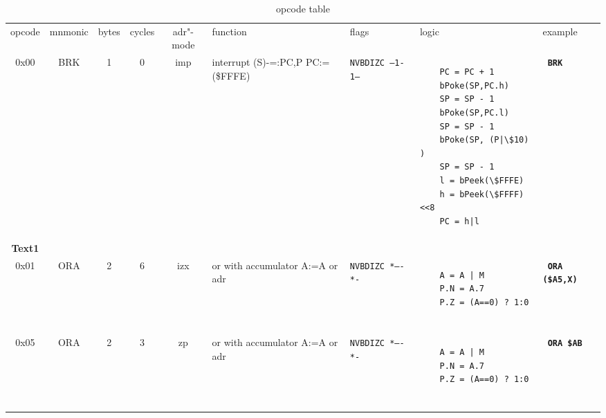 \documentclass[a4paper]{article}
\begin{document}
 
\setlength\parskip{0.5cm}


\newcommand{\flags}[2]{ 
\texttt{#1}\newline \texttt{#2}
}
\newcommand{\flagss}[2]{ 
\texttt{#1}\\ \texttt{#2}
}

\begin{sidewaystable}
  \centering
  \begin{tabular}{cccccp{2cm}p{1cm}p{6cm}p{3cm}}
opcode  &  mnmonic  &  bytes  &  cycles  &  adr"-mode  &  function  & flags & logic & example \\ 
0x00  &  BRK  & 1  & 0  &  imp  &  interrupt  \newline  (S)-=:PC,P PC:=(\$FFFE)  & \flags{NVBDIZC}{ --1-1-- } & \begin{lstlisting}
    PC = PC + 1 
    bPoke(SP,PC.h) 
    SP = SP - 1 
    bPoke(SP,PC.l) 
    SP = SP - 1 
    bPoke(SP, (P|\$10) ) 
    SP = SP - 1 
    l = bPeek(\$FFFE) 
    h = bPeek(\$FFFF)<<8 
    PC = h|l              
\end{lstlisting} &  \textbf{\texttt{ BRK  }} \\
 \multicolumn{1}{|c|}{\textbf{Text1}} & & & & & & & & \\
0x01  &  ORA  & 2  & 6  &  izx  &  or with accumulator  \newline  A:=A or {adr}  & \flags{NVBDIZC}{ *----*- } & \begin{lstlisting}
    A = A | M 
    P.N = A.7 
    P.Z = (A==0) ? 1:0  
 
\end{lstlisting} &  \textbf{\texttt{ ORA  (\$A5,X)}} \\
0x05  &  ORA  & 2  & 3  &  zp  &  or with accumulator  \newline  A:=A or {adr}  & \flags{NVBDIZC}{ *----*- } & \begin{lstlisting}
    A = A | M 
    P.N = A.7 
    P.Z = (A==0) ? 1:0  
 
\end{lstlisting} &  \textbf{\texttt{ ORA  \$AB}} \\
  \end{tabular}
  \caption{opcode table}
  \label{tab:opcode}
\end{sidewaystable}
\end{document}
